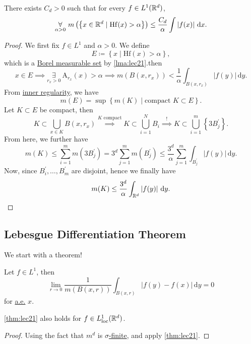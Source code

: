 \begin{theorem}\label{thm:HL-maximal-inequality}
	There exists \(C_{d} >0\) such that for every \(f\in L^1(\mathbb{\MakeUppercase{r}} ^d)\),
	\[
		\underset{\alpha >0}{\forall }\ m\left(\left\{x\in \mathbb{\MakeUppercase{r}} ^d\mid \mathrm{Hf}(x) > \alpha  \right\}\right) \leq \frac{C_{d} }{\alpha }\int \left\vert f(x) \right\vert \,\mathrm{d} x.
	\]
\end{theorem}
\begin{proof}
	We first fix \(f\in L^1\) and \(\alpha >0\). We define
	\[
		E\coloneqq \left\{x\mid \mathrm{Hf} (x) > \alpha \right\},
	\]
	which is a \hyperref[def:A-measurable-set]{Borel measurable set} by \autoref{lma:lec21}.then
	\[
		x\in E\implies \underset{r_{x} >0}{\exists } \ \mathrm{A} _{r_{x} }(x)> \alpha \implies m(B(x, r_{x} ))< \frac{1}{\alpha }\int _{B(x, r_{x} )}\left\vert f(y) \right\vert \,\mathrm{d} y.
	\]
	From \hyperref[thm:inner-regularity]{inner regularity}, we have
	\[
		m(E) = \sup \left\{m(K)\mid \text{compact }K\subset E \right\}.
	\]
	Let \(K\subset E\) be compact, then
	\[
		K\subset \bigcup\limits_{x\in K}B(x, r_{x} ) \overset{K \text{ compact} }{\implies } K\subset \bigcup\limits_{i=1}^{N} B_{i} \overset{\hyperref[lma:Vitali-type-covering-lemma]{!}}{\implies} K\subset \bigcup\limits_{i=1}^{m} \left\{3 B_{j} ^\prime \right\}.
	\]
	From here, we further have
	\[
		m(K) \leq \sum\limits_{i=1}^{m} m(3 B_{j} ^\prime ) = 3^d \sum\limits_{j=1}^{m} m(B_{j} ^\prime ) \leq \frac{3^d}{\alpha }\sum\limits_{j=1}^{m} \int _{B_{j} ^\prime }\left\vert f(y) \right\vert \,\mathrm{d}y.
	\]
	Now, since \(B^\prime _{i} , \ldots , B^\prime _{m}  \) are disjoint, hence we finally have
	\[
		m(K) \leq \frac{3^d}{\alpha }\int _{\mathbb{\MakeUppercase{r}} ^d}\left\vert f(y) \right\vert \,\mathrm{d} y.
	\]
\end{proof}

\subsection{Lebesgue Differentiation Theorem}
We start with a theorem!
\begin{theorem}\label{thm:lec21}
	Let \(f\in L^1\), then
	\[
		\lim\limits_{r \to 0} \frac{1}{m(B(x, r))}\int_{B(x, r)}\left\vert f(y) - f(x) \right\vert   \,\mathrm{d}y = 0
	\]
	for \hyperref[def:mu-almost-everywhere]{a.e.} \(x\).
\end{theorem}

\begin{corollary}
	\autoref{thm:lec21} also holds for \(f\in L^1_{\text{loc}}(\mathbb{\MakeUppercase{r}} ^d)\).
\end{corollary}
\begin{proof}
	Using the fact that \(m^d\) is \hyperref[def:finite-measure]{\(\sigma \)-finite}, and apply \autoref{thm:lec21}.
\end{proof}

